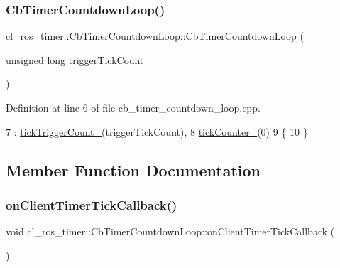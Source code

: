 \subsubsection{\texorpdfstring{Cb\+Timer\+Countdown\+Loop()}{CbTimerCountdownLoop()}}
{\footnotesize\ttfamily cl\+\_\+ros\+\_\+timer\+::\+Cb\+Timer\+Countdown\+Loop\+::\+Cb\+Timer\+Countdown\+Loop (\begin{DoxyParamCaption}\item[{unsigned long}]{trigger\+Tick\+Count }\end{DoxyParamCaption})}



Definition at line 6 of file cb\+\_\+timer\+\_\+countdown\+\_\+loop.\+cpp.


\begin{DoxyCode}
7     : \hyperlink{classcl__ros__timer_1_1CbTimerCountdownLoop_af377585c3d4499a4eec4668549181ae1}{tickTriggerCount\_}(triggerTickCount),
8       \hyperlink{classcl__ros__timer_1_1CbTimerCountdownLoop_a2b2d192bae0da3d26c6e3011583f9a6a}{tickCounter\_}(0)
9 \{
10 \}
\end{DoxyCode}


\subsection{Member Function Documentation}
\mbox{\label{classcl__ros__timer_1_1CbTimerCountdownLoop_acb16f3448ad5955bf36e7c2cfd9f691c}} 
\subsubsection{\texorpdfstring{on\+Client\+Timer\+Tick\+Callback()}{onClientTimerTickCallback()}}
{\footnotesize\ttfamily void cl\+\_\+ros\+\_\+timer\+::\+Cb\+Timer\+Countdown\+Loop\+::on\+Client\+Timer\+Tick\+Callback (\begin{DoxyParamCaption}{ }\end{DoxyParamCaption})\hspace{0.3cm}{\ttfamily [private]}}



